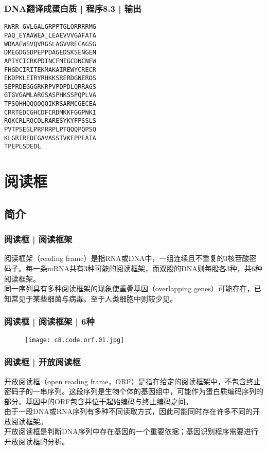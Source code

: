 \begin{frame}[fragile]
  \frametitle{DNA翻译成蛋白质 | 程序8.3 | 输出}
\begin{lstlisting}[firstnumber=1]
RWRR_GVLGALGRPPTGLQRRRRMG
PAQ_EYAAWEA_LEAEVVVGAFATA
WDAAEWSVQVRGSLAGVVRECAGSG
DMEGDGSDPEPPDAGEDSKSENGEN
APIYCICRKPDINCFMIGCDNCNEW
FHGDCIRITEKMAKAIREWYCRECR
EKDPKLEIRYRHKKSRERDGNERDS
SEPRDEGGGRKRPVPDPDLQRRAGS
GTGVGAMLARGSASPHKSSPQPLVA
TPSQHHQQQQQQIKRSARMCGECEA
CRRTEDCGHCDFCRDMKKFGGPNKI
RQKCRLRQCQLRARESYKYFPSSLS
PVTPSESLPRPRRPLPTQQQPQPSQ
KLGRIREDEGAVASSTVKEPPEATA
TPEPLSDEDL
\end{lstlisting}
\end{frame}

\section{阅读框}
\subsection{简介}
\begin{frame}
  \frametitle{阅读框 | 阅读框架}
  阅读框架（reading frame）是指RNA或DNA中，一组连续且不重复的3核苷酸密码子。每一条mRNA共有3种可能的阅读框架，而双股的DNA则每股各3种，共6种阅读框架。\\
  \vspace{1em}
  同一序列具有多种阅读框架的现象使重叠基因（overlapping genes）可能存在，已知常见于某些细菌与病毒。至于人类细胞中则较少见。
\end{frame}

\begin{frame}
  \frametitle{阅读框 | 阅读框架 | \alert{6种}}
  \begin{figure}
    \centering
    \texttt{[image: c8.code.orf.01.jpg]}
  \end{figure}
\end{frame}

\begin{frame}
  \frametitle{阅读框 | \alert{开放阅读框}}
  开放阅读框（open reading frame，ORF）是指在给定的阅读框架中，不包含终止密码子的一串序列。这段序列是生物个体的基因组中，可能作为蛋白质编码序列的部分。基因中的ORF包含并位于起始编码与终止编码之间。\\
  \vspace{1em}
  由于一段DNA或RNA序列有多种不同读取方式，因此可能同时存在许多不同的开放阅读框架。\\
  \vspace{1em}
  开放阅读框是判断DNA序列中存在基因的一个重要依据；基因识别程序需要进行开放阅读框的分析。
\end{frame}


